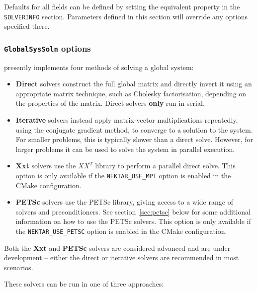 Defaults for all fields can be defined by setting the equivalent property in
the \texttt{SOLVERINFO} section. Parameters defined in this section will
override any options specified there.


\subsubsection{\texttt{GlobalSysSoln} options}

\nekpp presently implements four methods of solving a global system:

\begin{itemize}
  \item \textbf{Direct} solvers construct the full global matrix and directly
  invert it using an appropriate matrix technique, such as Cholesky
  factorisation, depending on the properties of the matrix. Direct solvers
  \textbf{only} run in serial.
  \item \textbf{Iterative} solvers instead apply matrix-vector multiplications
  repeatedly, using the conjugate gradient method, to converge to a solution to
  the system. For smaller problems, this is typically slower than a direct
  solve. However, for larger problems it can be used to solve the system in
  parallel execution.
  \item \textbf{Xxt} solvers use the $XX^T$ library to perform a parallel direct
  solve. This option is only available if the \texttt{NEKTAR\_USE\_MPI} option
  is enabled in the CMake configuration.
  \item \textbf{PETSc} solvers use the PETSc library, giving access to a wide
  range of solvers and preconditioners. See section~\ref{sec:petsc} below for
  some additional information on how to use the PETSc solvers. This option is
  only available if the \texttt{NEKTAR\_USE\_PETSC} option is enabled in the
  CMake configuration.
\end{itemize}

\begin{warningbox}
Both the \textbf{Xxt} and \textbf{PETSc} solvers are considered advanced and are
under development -- either the direct or iterative solvers are recommended in
most scenarios.
\end{warningbox}

These solvers can be run in one of three approaches:

